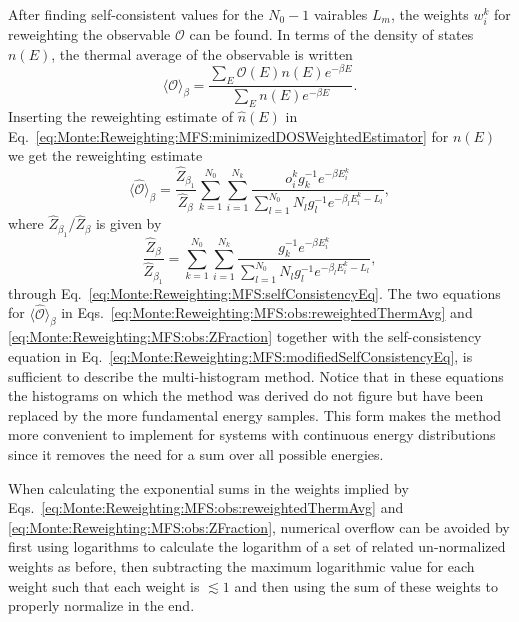 After finding self-consistent values for the $N_0-1$ vairables $L_m$, the weights $w_i^k$ for reweighting the observable $\mathcal{O}$ can be found. In terms of the
density of states $n(E)$, the thermal average of the observable is written
\begin{equation}
    \label{eq:Monte:Reweighting:MFS:obs:thermAvg}
    \langle\mathcal{O}\rangle_\beta = \frac{\sum_E\mathcal{O}(E)n(E)e^{-\beta E}}{\sum_En(E)e^{-\beta E}}.
\end{equation}
Inserting the reweighting estimate of $\hat{n}(E)$ in Eq.~\eqref{eq:Monte:Reweighting:MFS:minimizedDOSWeightedEstimator} for $n(E)$ we get the reweighting estimate
\begin{equation}
    \label{eq:Monte:Reweighting:MFS:obs:reweightedThermAvg}
    \langle\hat{\mathcal{O}}\rangle_\beta = \frac{\hat{Z}_{\beta_1}}{\hat{Z}_\beta}\sum_{k=1}^{N_0}\sum_{i=1}^{N_k}\frac{o_i^kg_k^{-1}e^{-\beta E_i^k}}{\sum_{l=1}^{N_0}N_lg_l^{-1}e^{-\beta_lE_i^k-L_l}},
\end{equation}
where $\hat{Z}_{\beta_1}/\hat{Z}_\beta$ is given by
\begin{equation}
    \label{eq:Monte:Reweighting:MFS:obs:ZFraction}
    \frac{\hat{Z}_\beta}{\hat{Z}_{\beta_1}} = \sum_{k=1}^{N_0}\sum_{i=1}^{N_k}\frac{g_k^{-1}e^{-\beta E_i^k}}{\sum_{l=1}^{N_0}N_lg_l^{-1}e^{-\beta_lE_i^k - L_l}},
\end{equation}
through Eq.~\eqref{eq:Monte:Reweighting:MFS:selfConsistencyEq}. The two equations for $\langle\hat{\mathcal{O}}\rangle_\beta$ in
Eqs.~\eqref{eq:Monte:Reweighting:MFS:obs:reweightedThermAvg} and \eqref{eq:Monte:Reweighting:MFS:obs:ZFraction} together with the self-consistency equation in
Eq.~\eqref{eq:Monte:Reweighting:MFS:modifiedSelfConsistencyEq}, is sufficient to describe the multi-histogram method. Notice that in these equations the
histograms on which the method was derived do not figure but have been replaced by the more fundamental energy samples. This form makes the method more convenient
to implement for systems with continuous energy distributions since it removes the need for a sum over all possible energies.

When calculating the exponential sums in the weights implied by
Eqs.~\eqref{eq:Monte:Reweighting:MFS:obs:reweightedThermAvg} and \eqref{eq:Monte:Reweighting:MFS:obs:ZFraction}, numerical overflow can be avoided by first using
logarithms to calculate the logarithm of a set of related un-normalized weights as before, then subtracting the maximum logarithmic value for each weight such that
each weight is $\lesssim1$ and then using the sum of these weights to properly normalize in the end.

